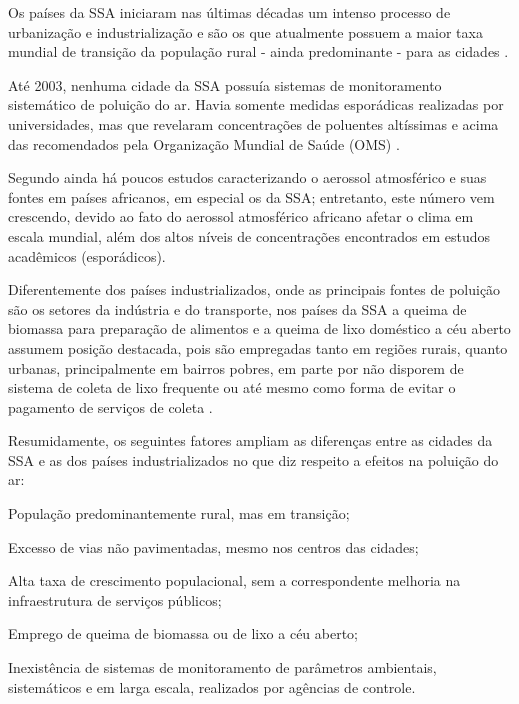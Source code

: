 Os países da SSA iniciaram nas últimas décadas um intenso processo de urbanização e
industrialização e são os que atualmente possuem a maior taxa mundial de transição 
da população rural - ainda predominante - para as cidades 
\citep{MONTGOMERY2008}. 
 
Até 2003, nenhuma cidade da SSA possuía sistemas de monitoramento 
sistemático de poluição do ar. Havia somente medidas esporádicas realizadas
por universidades, mas que revelaram concentrações de poluentes altíssimas e 
acima das recomendados pela Organização Mundial de Saúde (OMS) 
\citep{EZZATI2004}.

Segundo \citet{aboh2009} ainda há poucos estudos caracterizando o 
aerossol atmosférico e suas fontes em países africanos, em especial os da SSA; 
entretanto, este número vem crescendo, devido ao fato do aerossol atmosférico 
africano afetar o clima em escala mundial, além dos altos níveis de 
concentrações encontrados em estudos acadêmicos (esporádicos).

Diferentemente dos países industrializados, onde as principais fontes de 
poluição são os setores da indústria e do transporte, nos países da SSA a 
queima de biomassa para preparação de alimentos e a queima de lixo 
doméstico a céu aberto assumem posição destacada, pois são empregadas tanto em 
regiões rurais, quanto urbanas, principalmente em bairros pobres, 
em parte por não disporem de sistema de coleta de lixo frequente ou 
até mesmo como forma de evitar o pagamento de serviços de coleta \citep{SMITH2004}.

Resumidamente, os seguintes fatores ampliam as diferenças entre as cidades da 
SSA e as dos países industrializados no que diz respeito a efeitos na 
poluição do ar:
 
\begin{itemize}
\begin{spacing}{1.0}
  \item População predominantemente rural, mas em transição;
  \item Excesso de vias não pavimentadas, mesmo nos centros das cidades;
  \item Alta taxa de crescimento populacional, sem a correspondente melhoria 
        na infraestrutura de serviços públicos;
  \item Emprego de queima de biomassa ou de lixo a céu aberto;
  \item Inexistência de sistemas de monitoramento de parâmetros ambientais, sistemáticos e em larga escala,
        realizados por agências de controle.
\end{spacing}
\end{itemize}

